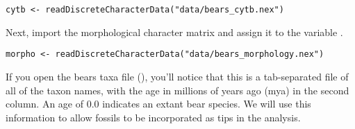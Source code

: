 {\tt \begin{snugshade*}
\begin{lstlisting}
cytb <- readDiscreteCharacterData("data/bears_cytb.nex") 
\end{lstlisting}
\end{snugshade*}}

Next, import the morphological character matrix and assign it to the variable . 
{\tt \begin{snugshade*}
\begin{lstlisting}
morpho <- readDiscreteCharacterData("data/bears_morphology.nex")
\end{lstlisting}
\end{snugshade*}}

%


If you open the bears taxa file (), you'll notice that this is a tab-separated file of all of the taxon names, with the age in millions of years ago (mya) in the second column. 
An age of 0.0 indicates an extant bear species. 
We will use this information to allow fossils to be incorporated as tips in the analysis. 

